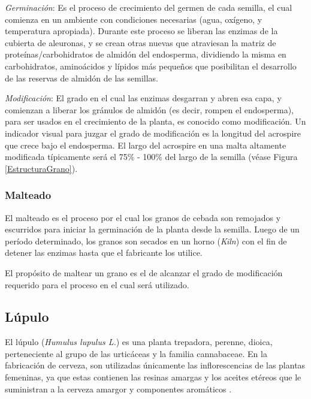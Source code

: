    	        \par \textit{Germinación}: 
    	        Es el proceso de crecimiento del germen de cada semilla, el cual comienza en un ambiente con condiciones necesarias (agua, oxígeno, y temperatura apropiada). Durante este proceso se liberan las enzimas de la cubierta de aleuronas, y se crean otras nuevas que atraviesan la matriz de proteínas/carbohidratos de almidón del endosperma, dividiendo la misma en carbohidratos, aminoácidos y lípidos más pequeños que posibilitan el desarrollo de las reservas de almidón de las semillas.
    	
    	        \par \textit{Modificación}:
    	        El grado en el cual las enzimas desgarran y abren esa capa, y comienzan a liberar los gránulos de almidón (es decir, rompen el endosperma), para ser usados en el crecimiento de la planta, es conocido como modificación. Un indicador visual para juzgar el grado de modificación es la longitud del acrospire que crece bajo el endosperma. El largo del acrospire en una malta altamente modificada típicamente será el 75\% - 100\% del largo de la semilla (véase Figura \ref{EstructuraGrano}). 
    	    \subsubsection{Malteado}
    	        \par El malteado es el proceso por el cual los granos de cebada son remojados y escurridos para iniciar la germinación de la planta desde la semilla. Luego de un período determinado, los granos son secados en un horno (\textit{Kiln}) con el fin de detener las enzimas hasta que el fabricante los utilice.
    	        
    	        \par El propósito de maltear un grano es el de alcanzar el grado de modificación requerido para el proceso en el cual será utilizado.
    	   
        \subsection{Lúpulo}
            \par El lúpulo (\textit{Humulus lupulus  L.}) es una planta trepadora, perenne, dioica, perteneciente al grupo de las urticáceas y la familia cannabaceae. En la fabricación de cerveza, son utilizadas únicamente las inflorescencias de las plantas femeninas, ya que estas contienen las resinas amargas y los aceites etéreos que le suministran a la cerveza amargor y componentes aromáticos \cite{Kunze}.
            
